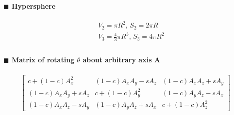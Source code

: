 \documentclass[10pt]{article}
\begin{document}
{\paragraph{$\blacksquare$ Hypersphere}
\begin{eqnarray*}
&& V_2=\pi R^2,\, S_2=2\pi R \\
&& V_3=\frac{4}{3}\pi R^3,\, S_3=4\pi R^2 \\
\end{eqnarray*}
\paragraph{$\blacksquare$ Matrix of rotating $\theta$ about arbitrary axis A}
\begin{gather*}
\begin{bmatrix}
c+(1-c)A_x^2 & (1-c)A_xA_y-sA_z & (1-c)A_xA_z+sA_y \\
(1-c)A_xA_y+sA_z & c+(1-c)A_y^2 & (1-c)A_yA_z-sA_x \\
(1-c)A_xA_z-sA_y & (1-c)A_yA_z+sA_x & c+(1-c)A_z^2
\end{bmatrix}
\end{gather*}
}
\end{document}

